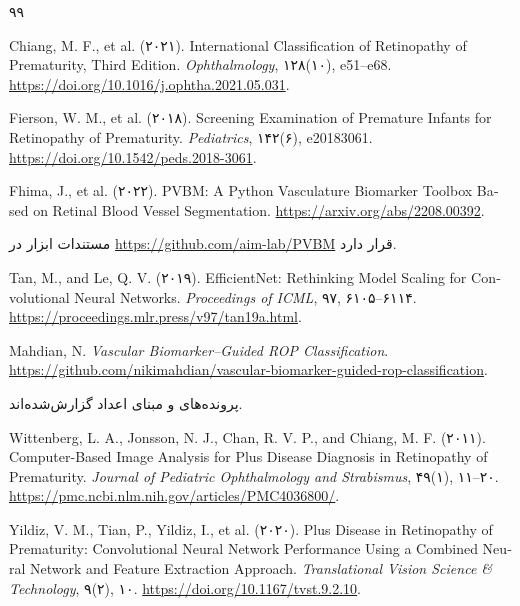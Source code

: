 


\begin{thebibliography}{۹۹}

\begin{latin}
Chiang, M. F., et al. (۲۰۲۱). International Classification of Retinopathy of Prematurity, Third Edition. \textit{Ophthalmology}, ۱۲۸(۱۰), e51--e68. \url{https://doi.org/10.1016/j.ophtha.2021.05.031}.
\end{latin}

\begin{latin}
Fierson, W. M., et al. (۲۰۱۸). Screening Examination of Premature Infants for Retinopathy of Prematurity. \textit{Pediatrics}, ۱۴۲(۶), e20183061. \url{https://doi.org/10.1542/peds.2018-3061}.
\end{latin}

\begin{latin}
Fhima, J., et al. (۲۰۲۲). PVBM: A Python Vasculature Biomarker Toolbox Based on Retinal Blood Vessel Segmentation. \url{https://arxiv.org/abs/2208.00392}.
\end{latin}
مستندات ابزار در \url{https://github.com/aim-lab/PVBM} قرار دارد.

\begin{latin}
Tan, M., and Le, Q. V. (۲۰۱۹). EfficientNet: Rethinking Model Scaling for Convolutional Neural Networks. \textit{Proceedings of ICML}, ۹۷, ۶۱۰۵--۶۱۱۴. \url{https://proceedings.mlr.press/v97/tan19a.html}.
\end{latin}

\begin{latin}
Mahdian, N. \textit{Vascular Biomarker--Guided ROP Classification}. \url{https://github.com/nikimahdian/vascular-biomarker-guided-rop-classification}.
\end{latin}
پرونده‌های  و  مبنای اعداد گزارش‌شده‌اند.

\begin{latin}
Wittenberg, L. A., Jonsson, N. J., Chan, R. V. P., and Chiang, M. F. (۲۰۱۱). Computer-Based Image Analysis for Plus Disease Diagnosis in Retinopathy of Prematurity. \textit{Journal of Pediatric Ophthalmology and Strabismus}, ۴۹(۱), ۱۱--۲۰. \url{https://pmc.ncbi.nlm.nih.gov/articles/PMC4036800/}.
\end{latin}

\begin{latin}
Yildiz, V. M., Tian, P., Yildiz, I., et al. (۲۰۲۰). Plus Disease in Retinopathy of Prematurity: Convolutional Neural Network Performance Using a Combined Neural Network and Feature Extraction Approach. \textit{Translational Vision Science \& Technology}, ۹(۲), ۱۰. \url{https://doi.org/10.1167/tvst.9.2.10}.
\end{latin}


\end{thebibliography}
